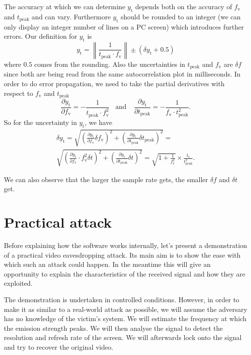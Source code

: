 \documentclass[a4paper,12pt,twoside,openright]{report}
\begin{document}
The accuracy at which we can determine $y_\text{t}$ depends both on the accuracy of $f_\text{v}$ and $t_\text{peak}$ and can vary. Furthermore $y_\text{t}$ should be rounded to an integer (we can only display an integer number of lines on a PC screen) which introduces further errors. Our definition for $y_\text{t}$ is
$$y_\text{t} = \left\| \frac{1}{t_\text{peak} \cdot f_\text{v}} \right\| \pm (\delta y_\text{t} + 0.5)$$
where $0.5$ comes from the rounding. Also the uncertainties in $t_\text{peak}$ and $f_\text{v}$ are $\delta f$ since both are being read from the same autocorrelation plot in milliseconds. In order to do error propagation, we need to take the partial derivatives with respect to $f_\text{v}$ and $t_\text{peak}$
$$\frac{\partial y_\text{t}}{\partial f_\text{v}} = - \frac{1}{t_\text{peak} \cdot f_\text{v}^2}
 \,\,\,\,\ \text{and} \,\,\,\,\ \
\frac{\partial y_\text{t}}{\partial t_\text{peak}} = - \frac{1}{f_\text{v} \cdot t_\text{peak}^2} .$$
So for the uncertainty in $y_\text{t}$, we have
\begin{multline}
\delta y_\text{t} =
\sqrt{\left( \frac{\partial y_\text{t}}{\partial f_\text{v}} \delta f_\text{v} \right)^2 + \left( \frac{\partial y_\text{t}}{\partial t_\text{peak}} \delta t_\text{peak} \right)^2} = \\
\sqrt{\left( \frac{\partial y_\text{t}}{\partial f_\text{v}} \cdot f^2_\text{v} \delta t \right)^2 + \left( \frac{\partial y_\text{t}}{\partial t_\text{peak}} \delta t \right)^2} = 
\sqrt{1+\frac{1}{f_\text{v}^2}} \times \frac{t_\text{s}}{t^2_\text{peak}} .
\end{multline}

We can also observe that the larger the sample rate gets, the smaller $\delta f$ and $\delta t$ get.

\chapter{Practical attack} 
\label{chap:practical}

Before explaining how the software works internally, let's present a demonstration of a practical video eavesdropping attack. Its main aim is to show the ease with which such an attack could happen. In the meantime this will give an opportunity to explain the characteristics of the received signal and how they are exploited.

The demonstration is undertaken in controlled conditions. However, in order to make it as similar to a real-world attack as possible, we will assume the adversary has no knowledge of the victim's system. We will estimate the frequency at which the emission strength peaks. We will then analyse the signal to detect the resolution and refresh rate of the screen. We will afterwards lock onto the signal and try to recover the original video.
\end{document}

